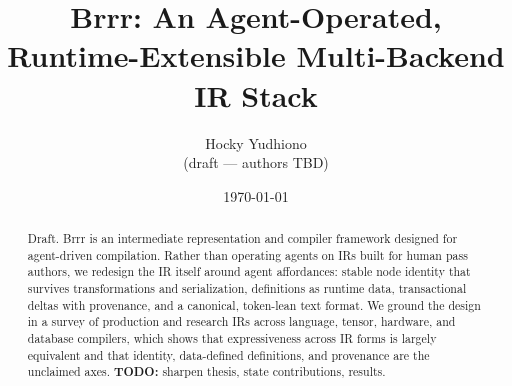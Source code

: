 \documentclass[11pt]{article}
\title{Brrr: An Agent-Operated, Runtime-Extensible Multi-Backend IR Stack}
\author{Hocky Yudhiono \\ \small (draft --- authors TBD)}
\date{\today}
\begin{document}
\maketitle

\begin{abstract}
Draft. Brrr is an intermediate representation and compiler framework designed for
agent-driven compilation. Rather than operating agents on IRs built for human pass
authors, we redesign the IR itself around agent affordances: stable node identity that
survives transformations and serialization, definitions as runtime data, transactional
deltas with provenance, and a canonical, token-lean text format. We ground the design
in a survey of production and research IRs across language, tensor, hardware, and
database compilers, which shows that expressiveness across IR forms is largely
equivalent and that identity, data-defined definitions, and provenance are the
unclaimed axes.
{\color{red}\textbf{TODO:}} sharpen thesis, state contributions, results.
\end{abstract}






% 
% 
% 
% 
% 



\end{document}
